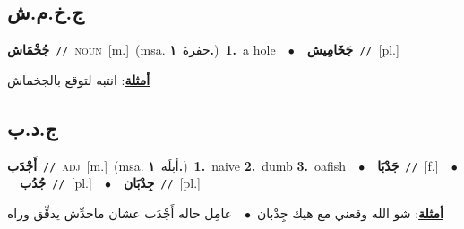 \documentclass[10pt,a4paper,twoside]{article} %
\begin{document}
\begin{multicols}{2}
\vspace{-3mm}
\subsection*{\color{blue}\foreignlanguage{arabic}{ج.خ.م.ش}\color{blue}{}} 

{\setlength\topsep{0pt}\textbf{\foreignlanguage{arabic}{جُخْمَاش}}\ {\color{gray}\texttt{//}\color{black}}\ \textsc{noun}\ [m.]\ \color{gray}(msa. \foreignlanguage{arabic}{حفرة}~\foreignlanguage{arabic}{\textbf{١.}})\color{black}\ \textbf{1.}~a hole\ \ $\bullet$\ \ \setlength\topsep{0pt}\textbf{\foreignlanguage{arabic}{جَخَامِيش}}\ {\color{gray}\texttt{//}\color{black}}\ [pl.]\  \begin{flushright}\color{gray}\foreignlanguage{arabic}{\textbf{\underline{\foreignlanguage{arabic}{أمثلة}}}: انتبه لتوقع بالجخماش}\end{flushright}\color{black}} \vspace{2mm}

\vspace{-3mm}
\subsection*{\color{blue}\foreignlanguage{arabic}{ج.د.ب}\color{blue}{}} 

{\setlength\topsep{0pt}\textbf{\foreignlanguage{arabic}{أَجْدَب}}\ {\color{gray}\texttt{//}\color{black}}\ \textsc{adj}\ [m.]\ \color{gray}(msa. \foreignlanguage{arabic}{أبلَه}~\foreignlanguage{arabic}{\textbf{١.}})\color{black}\ \textbf{1.}~naive  \textbf{2.}~dumb  \textbf{3.}~oafish\ \ $\bullet$\ \ \setlength\topsep{0pt}\textbf{\foreignlanguage{arabic}{جَدْبَا}}\ {\color{gray}\texttt{//}\color{black}}\ [f.]\ \ $\bullet$\ \ \setlength\topsep{0pt}\textbf{\foreignlanguage{arabic}{جُدُب}}\ {\color{gray}\texttt{//}\color{black}}\ [pl.]\ \ $\bullet$\ \ \setlength\topsep{0pt}\textbf{\foreignlanguage{arabic}{جِدْبَان}}\ {\color{gray}\texttt{//}\color{black}}\ [pl.]\  \begin{flushright}\color{gray}\foreignlanguage{arabic}{\textbf{\underline{\foreignlanguage{arabic}{أمثلة}}}: شو الله وقعني مع هيك جِدْبان\ $\bullet$\ \  عامِل حاله أَجْدَب عشان ماحدِّش يدقِّق وراه}\end{flushright}\color{black}} \vspace{2mm}


\end{multicols}
\end{document}
